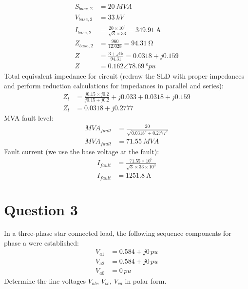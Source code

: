 \begin{align}
    S_{base,2} & = \SI{20}{MVA}                                                   \\
    V_{base,2} & = \SI{33}{kV}                                                    \\
    I_{base,2} & = \frac{20\times 10^3}{\sqrt{3}\times 33} = \SI{349.91}{\ampere} \\
    Z_{base,2} & = \frac{960}{12.028} = \SI{94.31}{\ohm}                          \\
    Z          & = \frac{3+j15}{94.31} = 0.0318+j0.159                            \\
    Z          & = 0.162\angle\SI{78.69}{\degree pu}
\end{align}
Total equivalent impedance for circuit (redraw the SLD with proper impedances and perform reduction calculations for impedances in parallel and series):
\begin{align}
    Z_t & = \frac{j0.15\times j0.2}{j0.15 +j0.2} + j0.033+0.0318+j0.159 \\
    Z_t & = 0.0318 +j0.2777
\end{align}
MVA fault level:
\begin{align}
    MVA_{fault} & = \frac{20}{\sqrt{0.0318^2+0.2777^2}} \\
    MVA_{fault} & = \SI{71.55}{MVA}
\end{align}
Fault current (we use the base voltage at the fault):
\begin{align}
    I_{fault} & = \frac{71.55\times 10^6}{\sqrt{3}\times 33\times 10^3} \\
    I_{fault} & = \SI{1251.8}{\ampere}
\end{align}
\section{Question 3}
In a three-phase star connected load, the following sequence components for phase a were established:
\begin{align}
    V_{a1} & = 0.584+j0 \,\si{pu} \\
    V_{a2} & = 0.584+j0 \,\si{pu} \\
    V_{a0} & = 0 \,\si{pu}
\end{align}
Determine the line voltages $V_{ab}$, $V_{bc}$, $V_{ca}$ in polar form.

